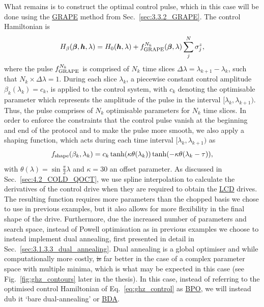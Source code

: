 \documentclass[a4paper,oneside,11pt]{book}
\newcommand{\betabb}{\boldsymbol{\beta}}
\newcommand{\hbb}{\boldsymbol{h}}
\newcommand{\sz}{\sigma^z}
\newcommand{\acrref}[1]{\hyperref[acr:#1]{#1}}
\providecommand{\DIFaddtex}[1]{{\protect\color{blue}\uwave{#1}}} %
\providecommand{\DIFdeltex}[1]{{\protect\color{red}\sout{#1}}}                      %
\providecommand{\DIFaddbegin}{} %
\providecommand{\DIFaddend}{} %
\providecommand{\DIFdelbegin}{} %
\providecommand{\DIFdelend}{} %
\providecommand{\DIFadd}[1]{\texorpdfstring{\DIFaddtex{#1}}{#1}} %
\providecommand{\DIFdel}[1]{\texorpdfstring{\DIFdeltex{#1}}{}} %
\newcommand{\DIFscaledelfig}{0.5}
\newlength{\DIFdelgraphicswidth} %
\newlength{\DIFdelgraphicsheight} %
\newcommand{\DIFaddincludegraphics}[2][]{{\color{blue}\fbox{\DIFOincludegraphics[#1]{#2}}}} %
\newcommand{\DIFdelincludegraphics}[2][]{%
\sbox{\DIFdelgraphicsbox}{\DIFOincludegraphics[#1]{#2}}%
\settoboxwidth{\DIFdelgraphicswidth}{\DIFdelgraphicsbox} %
\settoboxtotalheight{\DIFdelgraphicsheight}{\DIFdelgraphicsbox} %
\scalebox{\DIFscaledelfig}{%
\parbox[b]{\DIFdelgraphicswidth}{\usebox{\DIFdelgraphicsbox}\\[-\baselineskip] \rule{\DIFdelgraphicswidth}{0em}}\llap{\resizebox{\DIFdelgraphicswidth}{\DIFdelgraphicsheight}{%
\setlength{\unitlength}{\DIFdelgraphicswidth}%
\begin{picture}(1,1)%
\thicklines\linethickness{2pt} %
{\color[rgb]{1,0,0}\put(0,0){\framebox(1,1){}}}%
{\color[rgb]{1,0,0}\put(0,0){\line( 1,1){1}}}%
{\color[rgb]{1,0,0}\put(0,1){\line(1,-1){1}}}%
\end{picture}%
}\hspace*{3pt}}} %
} %
\DeclareRobustCommand{\DIFaddbegin}{\DIFOaddbegin \let\includegraphics\DIFaddincludegraphics} %
\DeclareRobustCommand{\DIFaddend}{\DIFOaddend \let\includegraphics\DIFOincludegraphics} %
\DeclareRobustCommand{\DIFdelbegin}{\DIFOdelbegin \let\includegraphics\DIFdelincludegraphics} %
\DeclareRobustCommand{\DIFdelend}{\DIFOaddend \let\includegraphics\DIFOincludegraphics} %
\begin{document}
What remains is to construct the optimal control pulse, which in this case will be done using the \acrref{GRAPE} method from Sec.~\ref{sec:3.3.2_GRAPE}. The control Hamiltonian is
\begin{equation}\label{eq:ghz_control}
    H_{\beta}(\betabb, \hbb, \lambda) = H_0(\hbb, \lambda) + f^{N_k}_{\rm GRAPE}(\betabb, \lambda) \sum_j^N \sz_j,
\end{equation}
where the pulse $f^{N_k}_{\rm GRAPE}$ is comprised of $N_k$ time slices $\Delta \lambda = \lambda_{k+1} - \lambda_k$, such that $N_k \times \Delta \lambda = 1$. During each slice $\lambda_k$, a piecewise constant control amplitude $\beta_k(\lambda_k) = c_k$, is applied to the control system, with $c_k$ denoting the optimisable parameter which represents the amplitude of the pulse in the interval $[\lambda_k, \lambda_{k+1})$. Thus, the pulse comprises of $N_k$ optimisable parameters for $N_k$ time slices. In order to enforce the constraints that the control pulse vanish at the beginning and end of the protocol and to make the pulse more smooth, we also apply a shaping function, which acts during each time interval $[\lambda_k, \lambda_{k+1})$ as
\begin{equation}
        f_{\rm shape}(\beta_k, \lambda_k) = c_k \tanh (\kappa \theta(\lambda_k)) \tanh (- \kappa \theta(\lambda_k - \tau)),
\end{equation}
with $\theta(\lambda) = \sin \frac{\pi}{2} \lambda$ and $\kappa = 30$ an offset parameter. As discussed in Sec.~\ref{sec:4.2_COLD_QOCT}, we use spline interpolation to calculate the derivatives of the control drive when they are required to obtain the \acrref{LCD} drives. The resulting function requires more parameters than the chopped basis we chose to use in previous examples, but it also allows for more flexibility in the final shape of the drive. Furthermore, due the increased number of parameters and search space, instead of Powell optimisation as in previous examples we choose to instead implement dual annealing, first presented in detail in Sec.~\ref{sec:3.1.3.3_dual_annealing}. Dual annealing is a global optimiser and while computationally more costly, \DIFdelbegin \DIFdel{is }\DIFdelend \DIFaddbegin \DIFadd{it is generally }\DIFaddend far better in the case of a complex parameter space with multiple minima, which is what may be expected in this case (see Fig.~\ref{fig:ghz_contours} later in the thesis). In this case, instead of referring to the optimised control Hamiltonian of Eq.~\eqref{eq:ghz_control} as \acrref{BPO}, we will instead dub it `bare dual-annealing' or \acrref{BDA}. 
\end{document}
